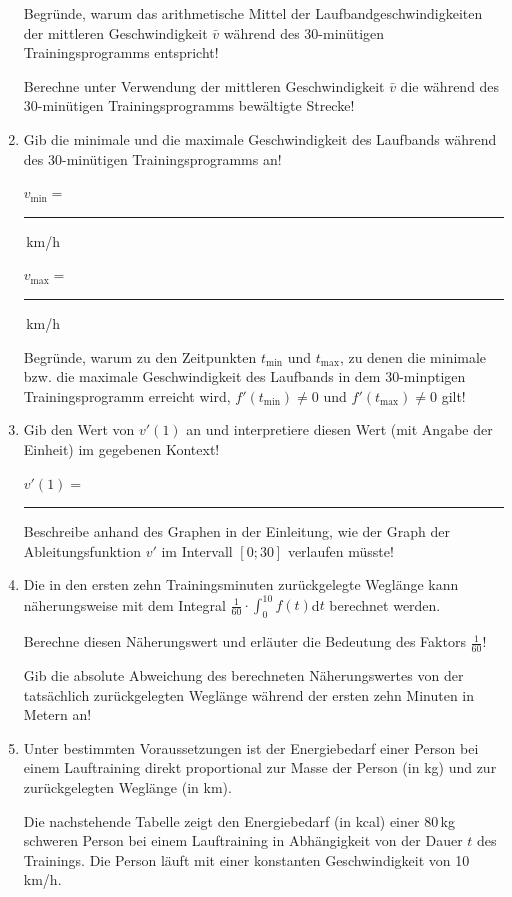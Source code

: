 \begin{langesbeispiel}
\begin{enumerate}
	Begründe, warum das arithmetische Mittel der Laufbandgeschwindigkeiten der mittleren Geschwindigkeit $\bar{v}$ während des 30-minütigen Trainingsprogramms entspricht!
	
	Berechne unter Verwendung der mittleren Geschwindigkeit $\bar{v}$ die während des 30-minütigen Trainingsprogramms bewältigte Strecke!
	
	\item Gib die minimale und die maximale Geschwindigkeit des Laufbands während des 30-minütigen Trainingsprogramms an!\leer
	
	$v_\text{min}=$ \rule{5cm}{0.3pt}\,km/h\leer
	
	$v_\text{max}=$ \rule{5cm}{0.3pt}\,km/h\leer
	
	Begründe, warum zu den Zeitpunkten $t_{\text{min}}$ und $t_{\text{max}}$, zu denen die minimale bzw. die maximale Geschwindigkeit des Laufbands in dem 30-minptigen Trainingsprogramm erreicht wird, $f'(t_{\text{min}})\neq 0$ und $f'(t_\text{max})\neq 0$ gilt!\leer
	
	\item Gib den Wert von $v'(1)$ an und interpretiere diesen Wert (mit Angabe der Einheit) im gegebenen Kontext!\leer
	
	$v'(1)=$ \rule{5cm}{0.3pt}\leer
	
	Beschreibe anhand des Graphen in der Einleitung, wie der Graph der Ableitungsfunktion $v'$ im Intervall $[0;30]$ verlaufen müsste!\leer
	
	\item Die in den ersten zehn Trainingsminuten zurückgelegte Weglänge kann näherungsweise mit dem Integral $\frac{1}{60}\cdot\int^{10}_0{f(t)}$d$t$ berechnet werden.
	
	Berechne diesen Näherungswert und erläuter die Bedeutung des Faktors $\frac{1}{60}$!\leer
	
	Gib die absolute Abweichung des berechneten Näherungswertes von der tatsächlich zurückgelegten Weglänge während der ersten zehn Minuten in Metern an!	\leer
	
	\item Unter bestimmten Voraussetzungen ist der Energiebedarf einer Person bei einem Lauftraining direkt proportional zur Masse der Person (in kg) und zur zurückgelegten Weglänge (in km).

Die nachstehende Tabelle zeigt den Energiebedarf (in kcal) einer 80\,kg schweren Person bei einem Lauftraining in Abhängigkeit von der Dauer $t$ des Trainings. Die Person läuft mit einer konstanten Geschwindigkeit von 10\,km/h.


\end{enumerate}
\end{langesbeispiel}
